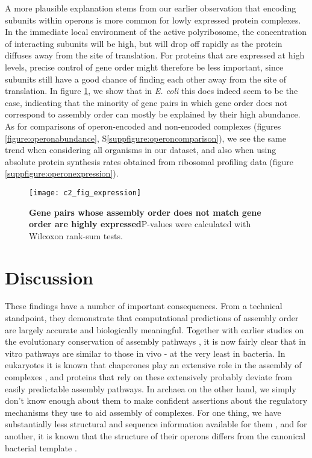 \documentclass[a4paper,11pt,twoside,openright]{scrbook}
\begin{document}
A more plausible explanation stems from our earlier observation that encoding subunits within operons is more common for lowly expressed protein complexes. In the immediate local environment of the active polyribosome, the concentration of interacting subunits will be high, but will drop off rapidly as the protein diffuses away from the site of translation. For proteins that are expressed at high levels, precise control of gene order might therefore be less important, since subunits still have a good chance of finding each other away from the site of translation. In figure \ref{figure:operonexpression}, we show that in \textit{E. coli} this does indeed seem to be the case, indicating that the minority of gene pairs in which gene order does not correspond to assembly order can mostly be explained by their high abundance. As for comparisons of operon-encoded and non-encoded complexes (figures \ref{figure:operonabundance}, S\ref{suppfigure:operoncomparison}), we see the same trend when considering all organisms in our dataset, and also when using absolute protein synthesis rates obtained from ribosomal profiling data (figure \ref{suppfigure:operonexpression}).

\begin{figure}[h]
\fcapsideright
    {\caption[Gene pairs whose assembly order does not match gene order are highly expressed]{\sffamily\textbf{Gene pairs whose assembly order does not match gene order are highly expressed}\newline \small P-values were calculated with Wilcoxon rank-sum tests.}\label{figure:operonexpression}}
    {\texttt{[image: c2\_fig\_expression]}}
\end{figure}

\section{Discussion}
These findings have a number of important consequences. From a technical standpoint, they demonstrate that computational predictions of assembly order are largely accurate and biologically meaningful. Together with earlier studies on the evolutionary conservation of assembly pathways \cite{Levy2008,Marsh2013}, it is now fairly clear that in vitro pathways are similar to those in vivo - at the very least in bacteria. In eukaryotes it is known that chaperones play an extensive role in the assembly of complexes \cite{Ellis2006}, and proteins that rely on these extensively probably deviate from easily predictable assembly pathways. In archaea on the other hand, we simply don't know enough about them to make confident assertions about the regulatory mechanisms they use to aid assembly of complexes. For one thing, we have substantially less structural and sequence information available for them \cite{Mukherjee2017}, and for another, it is known that the structure of their operons differs from the canonical bacterial template \cite{Koide2009}.
\end{document}
